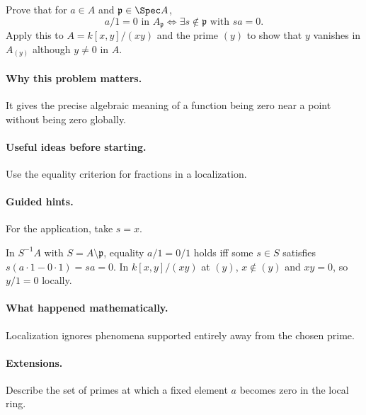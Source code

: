 \begin{problem}
Prove that for $a\in A$ and $\mathfrak p\in\Spec A$,
\[
a/1=0\text{ in }A_{\mathfrak p}
\iff
\exists s\notin\mathfrak p\text{ with }sa=0.
\]
Apply this to $A=k[x,y]/(xy)$ and the prime $(y)$ to show that $y$ vanishes in $A_{(y)}$ although $y\neq0$ in $A$.
\end{problem}

\paragraph{Why this problem matters.}
It gives the precise algebraic meaning of a function being zero near a point without being zero globally.

\paragraph{Useful ideas before starting.}
Use the equality criterion for fractions in a localization.

\paragraph{Guided hints.}
For the application, take $s=x$.

\begin{solution}
In $S^{-1}A$ with $S=A\setminus\mathfrak p$, equality $a/1=0/1$ holds iff some $s\in S$ satisfies $s(a\cdot1-0\cdot1)=sa=0$.  In $k[x,y]/(xy)$ at $(y)$, $x\notin(y)$ and $xy=0$, so $y/1=0$ locally.
\end{solution}

\paragraph{What happened mathematically.}
Localization ignores phenomena supported entirely away from the chosen prime.

\paragraph{Extensions.}
Describe the set of primes at which a fixed element $a$ becomes zero in the local ring.
